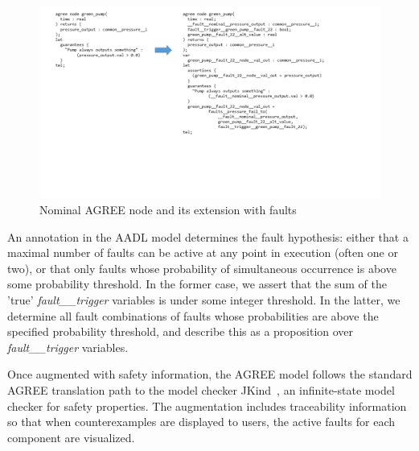 \begin{figure}
\vspace{-0.1in}
\includegraphics[trim=30 150 120 10,clip,width=\textwidth]{images/sample_code.png}
\vspace{-0.3in}
\caption{Nominal AGREE node and its extension with faults}
\label{fig:comp}
\end{figure}

An annotation in the AADL model determines the fault hypothesis: either that a maximal number of faults can be active at any point in execution (often one or two), or that only faults whose probability of simultaneous occurrence is above some probability threshold.  In the former case, we assert that the sum of the 'true' {\em fault\_\_trigger} variables is under some integer threshold.  In the latter, we determine all fault combinations of faults whose probabilities are above the specified probability threshold, and describe this as a proposition over {\em fault\_\_trigger} variables.

Once augmented with safety information, the AGREE model follows the standard AGREE translation path to the model checker JKind~\cite{2017arXiv171201222G}, an infinite-state model checker for safety properties.  The augmentation includes traceability information so that when counterexamples are displayed to users, the active faults for each component are visualized.



